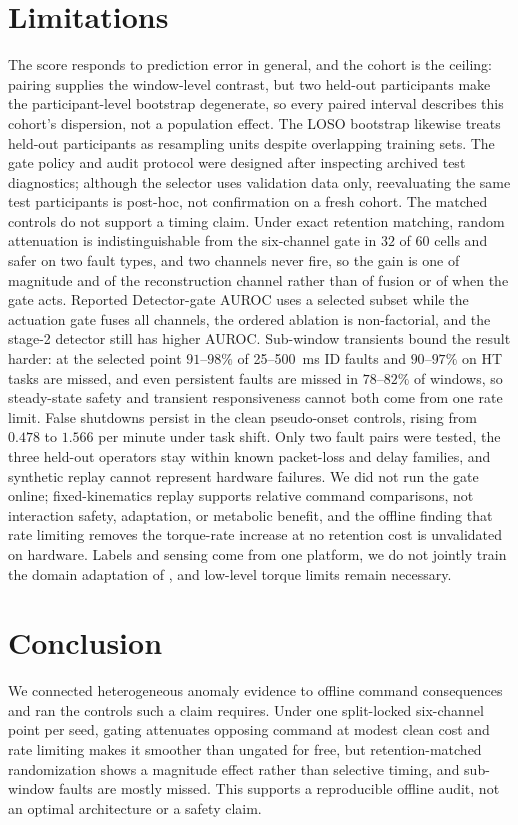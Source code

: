 \documentclass[letterpaper]{article} %
\begin{document}
\section{Limitations}
The score responds to prediction error in general, and the cohort is the ceiling: pairing supplies the window-level contrast, but two held-out participants make the participant-level bootstrap degenerate, so every paired interval describes this cohort's dispersion, not a population effect. The LOSO bootstrap likewise treats held-out participants as resampling units despite overlapping training sets. The gate policy and audit protocol were designed after inspecting archived test diagnostics; although the selector uses validation data only, reevaluating the same test participants is post-hoc, not confirmation on a fresh cohort.
The matched controls do not support a timing claim. Under exact retention matching, random attenuation is indistinguishable from the six-channel gate in $32$ of $60$ cells and safer on two fault types, and two channels never fire, so the gain is one of magnitude and of the reconstruction channel rather than of fusion or of when the gate acts. Reported Detector-gate AUROC uses a selected subset while the actuation gate fuses all channels, the ordered ablation is non-factorial, and the stage-2 detector still has higher AUROC.
Sub-window transients bound the result harder: at the selected point $91$--$98\%$ of 25--500~ms ID faults and $90$--$97\%$ on HT tasks are missed, and even persistent faults are missed in $78$--$82\%$ of windows, so steady-state safety and transient responsiveness cannot both come from one rate limit. False shutdowns persist in the clean pseudo-onset controls, rising from $0.478$ to $1.566$ per minute under task shift. Only two fault pairs were tested, the three held-out operators stay within known packet-loss and delay families, and synthetic replay cannot represent hardware failures.
We did not run the gate online; fixed-kinematics replay supports relative command comparisons, not interaction safety, adaptation, or metabolic benefit, and the offline finding that rate limiting removes the torque-rate increase at no retention cost is unvalidated on hardware. Labels and sensing come from one platform, we do not jointly train the domain adaptation of \citet{scherpereel2025domain}, and low-level torque limits remain necessary.

\section{Conclusion}
We connected heterogeneous anomaly evidence to offline command consequences and ran the controls such a claim requires. Under one split-locked six-channel point per seed, gating attenuates opposing command at modest clean cost and rate limiting makes it smoother than ungated for free, but retention-matched randomization shows a magnitude effect rather than selective timing, and sub-window faults are mostly missed. This supports a reproducible offline audit, not an optimal architecture or a safety claim.
\end{document}
